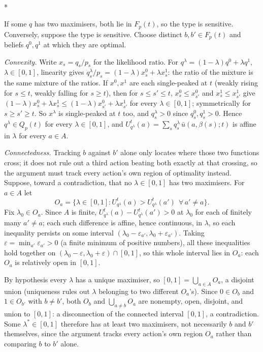 \documentclass[12pt]{article}
\makeatletter
\theoremstyle{definition}
\renewenvironment{proof}[1][\proofname]{\par
  \pushQED{\qed}%
  \normalfont \topsep6\p@\@plus6\p@\relax
  \trivlist
  \item[\hskip\labelsep\itshape #1\@addpunct{.}]\mbox{}\\*
  \ignorespaces
}{%
  \popQED\endtrivlist\@endpefalse
}
\makeatother
\begin{document}
\begin{proof}[Proof of Proposition \ref{prop:attainedtie}]
If some $q$ has two maximisers, both lie in $F_p(t)$, so the type is sensitive. Conversely, suppose the type is sensitive. Choose distinct $b, b' \in F_p(t)$ and beliefs $q^0, q^1$ at which they are optimal.

\emph{Convexity.} Write $x_s = q_s/p_s$ for the likelihood ratio. For $q^\lambda = (1-\lambda) q^0 + \lambda q^1$, $\lambda \in [0,1]$, linearity gives $q^\lambda_s/p_s = (1-\lambda) x^0_s + \lambda x^1_s$: the ratio of the mixture is the same mixture of the ratios. If $x^0, x^1$ are each single-peaked at $t$ (weakly rising for $s \le t$, weakly falling for $s \ge t$), then for $s \le s' \le t$, $x^0_s \le x^0_{s'}$ and $x^1_s \le x^1_{s'}$ give $(1-\lambda) x^0_s + \lambda x^1_s \le (1-\lambda) x^0_{s'} + \lambda x^1_{s'}$ for every $\lambda \in [0,1]$; symmetrically for $s \ge s' \ge t$. So $x^\lambda$ is single-peaked at $t$ too, and $q^\lambda_s > 0$ since $q^0_s, q^1_s > 0$. Hence $q^\lambda \in Q_p(t)$ for every $\lambda \in [0,1]$, and $U^t_{q^\lambda}(a) = \sum_s q^\lambda_s\, \bar u(a, \beta(s); t)$ is affine in $\lambda$ for every $a \in A$.

\emph{Connectedness.} Tracking $b$ against $b'$ alone only locates where those two functions cross; it does not rule out a third action beating both exactly at that crossing, so the argument must track every action's own region of optimality instead. Suppose, toward a contradiction, that no $\lambda \in [0,1]$ has two maximisers. For $a \in A$ let
\[
O_a = \{\lambda \in [0,1] : U^t_{q^\lambda}(a) > U^t_{q^\lambda}(a') \ \ \forall\, a' \neq a\}.
\]
Fix $\lambda_0 \in O_a$. Since $A$ is finite, $U^t_{q^\lambda}(a) - U^t_{q^\lambda}(a') > 0$ at $\lambda_0$ for each of finitely many $a' \neq a$; each such difference is affine, hence continuous, in $\lambda$, so each inequality persists on some interval $(\lambda_0 - \varepsilon_{a'}, \lambda_0 + \varepsilon_{a'})$. Taking $\varepsilon = \min_{a'} \varepsilon_{a'} > 0$ (a finite minimum of positive numbers), all these inequalities hold together on $(\lambda_0 - \varepsilon, \lambda_0 + \varepsilon) \cap [0,1]$, so this whole interval lies in $O_a$: each $O_a$ is relatively open in $[0,1]$.

By hypothesis every $\lambda$ has a unique maximiser, so $[0,1] = \bigcup_{a \in A} O_a$, a disjoint union (uniqueness rules out $\lambda$ belonging to two different $O_a$'s). Since $0 \in O_b$ and $1 \in O_{b'}$ with $b \neq b'$, both $O_b$ and $\bigcup_{a \neq b} O_a$ are nonempty, open, disjoint, and union to $[0,1]$: a disconnection of the connected interval $[0,1]$, a contradiction. Some $\lambda^* \in [0,1]$ therefore has at least two maximisers, not necessarily $b$ and $b'$ themselves, since the argument tracks every action's own region $O_a$ rather than comparing $b$ to $b'$ alone.
\end{proof}
\end{document}
